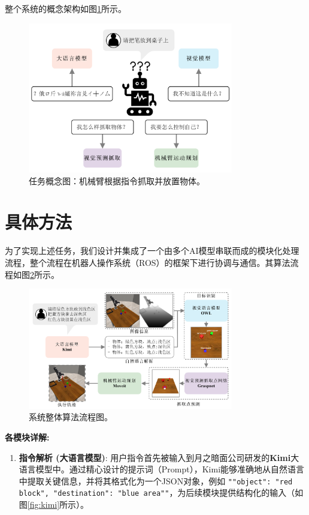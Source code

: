 \documentclass{article}
\begin{document}
\begin{CJK*}{UTF8}{gbsn}
整个系统的概念架构如图\ref{fig:concept}所示。
\begin{figure}[h!]
    \centering
    \includegraphics[width=0.8\textwidth]{image/report/1749437532114.png}
    \caption{任务概念图：机械臂根据指令抓取并放置物体。}
    \label{fig:concept}
\end{figure}

\section{具体方法}

为了实现上述任务，我们设计并集成了一个由多个AI模型串联而成的模块化处理流程，整个流程在机器人操作系统（ROS）的框架下进行协调与通信。其算法流程如图\ref{fig:flowchart}所示。

\begin{figure}[h!]
    \centering
    \includegraphics[width=0.8\textwidth]{image/report/1749437542527.png}
    \caption{系统整体算法流程图。}
    \label{fig:flowchart}
\end{figure}

\textbf{各模块详解:}

\begin{enumerate}
    \item  \textbf{指令解析 (大语言模型)}: 用户指令首先被输入到月之暗面公司研发的\textbf{Kimi}大语言模型中。通过精心设计的提示词（Prompt），Kimi能够准确地从自然语言中提取关键信息，并将其格式化为一个JSON对象，例如 \texttt{"{"object": "red block", "destination": "blue area"}"}，为后续模块提供结构化的输入（如图\ref{fig:kimi}所示）。
\end{enumerate}


\end{CJK*}
\end{document}
